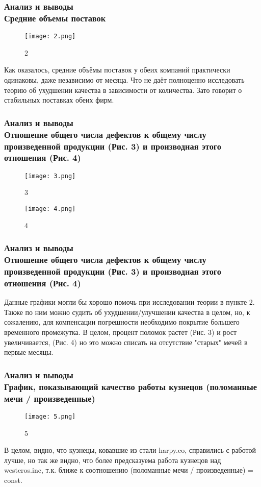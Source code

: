 \documentclass[8pt]{beamer}
\begin{document}
\begin{frame}
\frametitle{Анализ и выводы \\{\small Средние объемы поставок}}
\begin{figure}[h]
		\texttt{[image: 2.png]}
		\caption{2}
		\label{Second}
\end{figure}

Как оказалось, средние объёмы поставок у обеих компаний практически одинаковы, даже независимо от месяца. Что не даёт полноценно исследовать теорию об ухудшении качества в зависимости от количества. Зато говорит о стабильных поставках обеих фирм.
\end{frame}

\begin{frame}
\frametitle{Анализ и выводы\\ {\small Отношение общего числа дефектов к общему числу произведенной продукции (Рис. 3) и производная этого отношения (Рис. 4)}}
\begin{figure}[h]
		\texttt{[image: 3.png]}
		\caption{3}
		\label{Third}
\end{figure}

\begin{figure}[h]
		\texttt{[image: 4.png]}
		\caption{4}
		\label{Fourth}
\end{figure}

\end{frame}

\begin{frame}
\frametitle{Анализ и выводы\\ {\small Отношение общего числа дефектов к общему числу произведенной продукции (Рис. 3) и производная этого отношения (Рис. 4)}}
Данные графики могли бы хорошо помочь при исследовании теории в пункте 2. Также по ним можно судить об ухудшении/улучшении качества в целом, но, к сожалению, для компенсации погрешности необходимо покрытие большего временного промежутка. В целом, процент поломок растет (Рис. 3) и рост увеличивается, (Рис. 4) но это можно списать на отсутствие "старых" мечей в первые месяцы.
\end{frame}


\begin{frame}
\frametitle{Анализ и выводы\\{\small График, показывающий качество работы кузнецов (поломанные мечи / произведенные)}}
\begin{figure}[h]
		\texttt{[image: 5.png]}
		\caption{5}
		\label{Fifth}
\end{figure}

В целом, видно, что кузнецы, ковавшие из стали harpy.co, справились с работой лучше, но так же видно, что более предсказуема работа кузнецов над westeros.inc, т.к. ближе к соотношению (поломанные мечи / произведенные) = const.
\end{frame}
\end{document}
